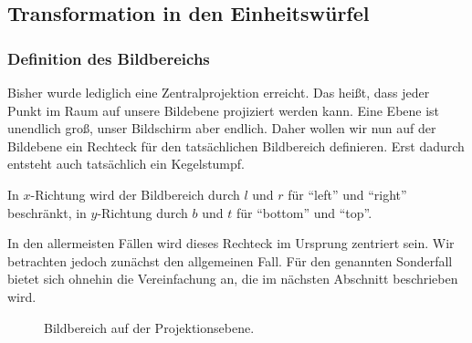 \documentclass[a4paper,parskip=full*]{scrartcl}
\begin{document}
\subsection{Transformation in den Einheitswürfel}
\subsubsection{Definition des Bildbereichs}
Bisher wurde lediglich eine Zentralprojektion erreicht. Das heißt, dass
jeder Punkt im Raum auf unsere Bildebene projiziert werden kann. Eine
Ebene ist unendlich groß, unser Bildschirm aber endlich. Daher wollen
wir nun auf der Bildebene ein Rechteck für den tatsächlichen Bildbereich
definieren. Erst dadurch entsteht auch tatsächlich ein Kegelstumpf.

In $x$-Richtung wird der Bildbereich durch $l$ und $r$ für "`left"' und
"`right"' beschränkt, in $y$-Richtung durch $b$ und $t$ für "`bottom"'
und "`top"'.

In den allermeisten Fällen wird dieses Rechteck im Ursprung zentriert
sein. Wir betrachten jedoch zunächst den allgemeinen Fall. Für den
genannten Sonderfall bietet sich ohnehin die Vereinfachung an, die im
nächsten Abschnitt beschrieben wird.

\begin{figure}[h]
	\centering
	
	\caption%
	{Bildbereich auf der Projektionsebene.}

	\label{lrtb}
\end{figure}
\end{document}
